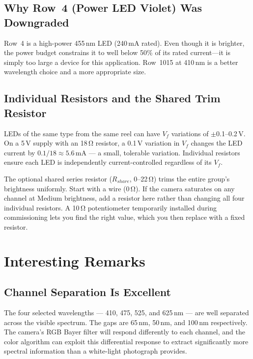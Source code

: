 \documentclass[12pt,letterpaper]{article}
\begin{document}
\subsection{Why Row~4 (Power LED Violet) Was Downgraded}

Row~4 is a high-power 455\,nm LED (240\,mA rated). Even though it is brighter, the power
budget constrains it to well below 50\% of its rated current---it is simply too large a device
for this application. Row~1015 at 410\,nm is a better wavelength choice and a more appropriate
size.

\subsection{Individual Resistors and the Shared Trim Resistor}

LEDs of the same type from the same reel can have $V_f$ variations of $\pm$0.1--0.2\,V.
On a 5\,V supply with an 18\,\si{\ohm} resistor, a 0.1\,V variation in $V_f$ changes the
LED current by $0.1/18 \approx 5.6$\,mA --- a small, tolerable variation. Individual resistors
ensure each LED is independently current-controlled regardless of its $V_f$.

The optional shared series resistor ($R_{share}$, 0--22\,\si{\ohm}) trims the entire group's
brightness uniformly. Start with a wire (0\,\si{\ohm}). If the camera saturates on any channel
at Medium brightness, add a resistor here rather than changing all four individual resistors.
A 10\,\si{\ohm} potentiometer temporarily installed during commissioning lets you find the
right value, which you then replace with a fixed resistor.

\section{Interesting Remarks}

\subsection{Channel Separation Is Excellent}

The four selected wavelengths --- 410, 475, 525, and 625\,nm --- are well separated across
the visible spectrum. The gaps are 65\,nm, 50\,nm, and 100\,nm respectively. The camera's
RGB Bayer filter will respond differently to each channel, and the color algorithm can
exploit this differential response to extract significantly more spectral information than
a white-light photograph provides.
\end{document}
